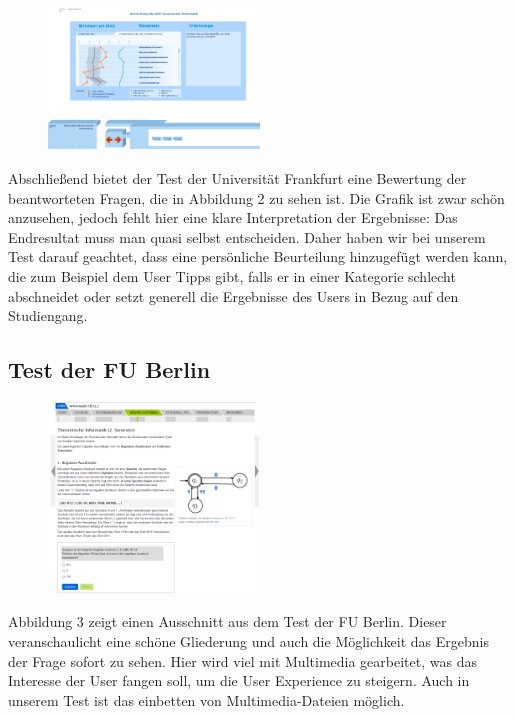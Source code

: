 \begin{figure}[htbp] 
  \centering
     \includegraphics[width=0.5\textwidth]{Jonas_Images/frankfurt2.png}
  \caption{}
  \label{fig:Bild2}
\end{figure}
Abschließend bietet der Test der Universität Frankfurt eine Bewertung der beantworteten Fragen, die in Abbildung 2 zu sehen ist. Die Grafik ist zwar schön anzusehen, jedoch fehlt hier eine klare Interpretation der Ergebnisse: Das Endresultat muss man quasi selbst entscheiden. Daher haben wir bei unserem Test darauf geachtet, dass eine persönliche Beurteilung hinzugefügt werden kann, die zum Beispiel dem User Tipps gibt, falls er in einer Kategorie schlecht abschneidet oder setzt generell die Ergebnisse des Users in Bezug auf den Studiengang.
\subsection{Test der FU Berlin}
\begin{figure}[htbp] 
  \centering
     \includegraphics[width=0.5\textwidth]{Jonas_Images/berlin.png}
  \caption{}
  \label{fig:Bild3}
\end{figure}
Abbildung 3 zeigt einen Ausschnitt aus dem  Test der FU Berlin\cite{Berlin}. Dieser veranschaulicht eine schöne Gliederung und auch die Möglichkeit das Ergebnis der Frage sofort zu sehen. Hier wird viel mit Multimedia gearbeitet, was das Interesse der User fangen soll, um die User Experience zu steigern. Auch in unserem Test ist das einbetten von Multimedia-Dateien möglich.
